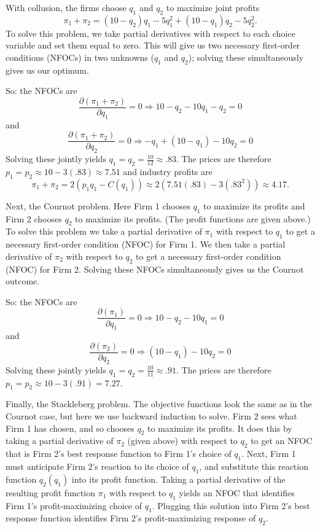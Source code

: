\begin{enumerate}
{With collusion, the firms choose $q_1$ and $q_2$ to maximize joint profits
\[
\pi_1+\pi_2=(10-q_2)q_1-5q_1^2+(10-q_1)q_2-5q_2^2.
\]
To solve this problem, we take partial derivatives with respect to each choice variable and set them equal to zero. This will give us two necessary first-order conditions (NFOCs) in two unknowns ($q_1$ and $q_2$); solving these simultaneously gives us our optimum.

So: the NFOCs are
\[
\frac{\partial (\pi_1+\pi_2)}{\partial q_1}=0\Longrightarrow 10-q_2-10q_1-q_2=0
\]
and
\[
\frac{\partial (\pi_1+\pi_2)}{\partial q_2}=0\Longrightarrow -q_1 + (10-q_1) -10q_2=0
\]
Solving these jointly yields $q_1=q_2=\frac{10}{12}\approx .83$. The prices are therefore $p_1=p_2\approx 10-3(.83)\approx 7.51$ and industry profits are
\[
\pi_1+\pi_2=2\left(p_1q_1-C(q_1)\right)\approx 2\left(7.51(.83)-3(.83^2)\right)\approx 4.17.
\]


Next, the Cournot problem. Here Firm 1 chooses $q_1$ to maximize its profits and Firm 2 chooses $q_2$ to maximize its profits. (The profit functions are given above.) To solve this problem we take a partial derivative of $\pi_1$ with respect to $q_1$ to get a necessary first-order condition (NFOC) for Firm 1. We then take a partial derivative of $\pi_2$ with respect to $q_2$ to get a necessary first-order condition (NFOC) for Firm 2. Solving these NFOCs simultaneously gives us the Cournot outcome.

So: the NFOCs are
\[
\frac{\partial (\pi_1)}{\partial q_1}=0\Longrightarrow 10-q_2-10q_1=0
\]
and
\[
\frac{\partial (\pi_2)}{\partial q_2}=0\Longrightarrow (10-q_1) -10q_2=0
\]
Solving these jointly yields $q_1=q_2=\frac{10}{11}\approx .91$. The prices are therefore $p_1=p_2\approx 10-3(.91)=7.27$.


Finally, the Stackleberg problem. The objective functions look the same as in the Cournot case, but here we use backward induction to solve. Firm 2 sees what Firm 1 has chosen, and so chooses $q_2$ to maximize its profits. It does this by taking a partial derivative of $\pi_2$ (given above) with respect to $q_2$ to get an NFOC that is Firm 2's best response function to Firm 1's choice of $q_1$. Next, Firm 1 must anticipate Firm 2's reaction to its choice of $q_1$, and substitute this reaction function $q_2(q_1)$ into its profit function. Taking a partial derivative of the resulting profit function $\pi_1$ with respect to $q_1$ yields an NFOC that identifies Firm 1's profit-maximizing choice of $q_1$. Plugging this solution into Firm 2's best response function identifies Firm 2's profit-maximizing response of $q_2$.

}
\end{enumerate}
